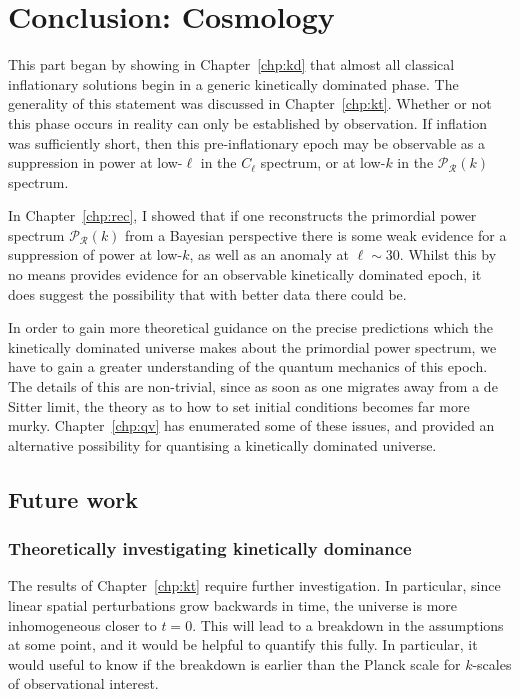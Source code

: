 \chapter*[Conclusion: Cosmology]{Conclusion: Cosmology}

This part began by showing in Chapter~\ref{chp:kd} that almost all classical inflationary solutions begin in a generic kinetically dominated phase. The generality of this statement was discussed in Chapter~\ref{chp:kt}. 
Whether or not this phase occurs in reality can only be established by observation. If inflation was sufficiently short, then this pre-inflationary epoch may be observable as a suppression in power at low-\(\ell\) in the \(C_\ell\) spectrum, or at low-\(k\) in the \(\mathcal{P}_\mathcal{R}(k)\) spectrum. 

In Chapter~\ref{chp:rec}, I showed that if one reconstructs the primordial power spectrum \(\mathcal{P}_\mathcal{R}(k)\) from a Bayesian perspective there is some weak evidence for a suppression of power at low-\(k\), as well as an anomaly at \(\ell\sim30\). Whilst this by no means provides evidence for an observable kinetically dominated epoch, it does suggest the possibility that with better data there could be.

In order to gain more theoretical guidance on the precise predictions which the kinetically dominated universe makes about the primordial power spectrum, we have to gain a greater understanding of the quantum mechanics of this epoch. The details of this are non-trivial, since as soon as one migrates away from a de Sitter limit, the theory as to how to set initial conditions becomes far more murky. Chapter~\ref{chp:qv} has enumerated some of these issues, and provided an alternative possibility for quantising a kinetically dominated universe.

\section*{Future work}
\subsection*{Theoretically investigating kinetically dominance}
The results of Chapter~\ref{chp:kt} require further investigation. In particular, since linear spatial perturbations grow backwards in time, the universe is more inhomogeneous closer to \(t=0\). This will lead to a breakdown in the assumptions at some point, and it would be helpful to quantify this fully. In particular, it would useful to know if the breakdown is earlier than the Planck scale for \(k\)-scales of observational interest.


